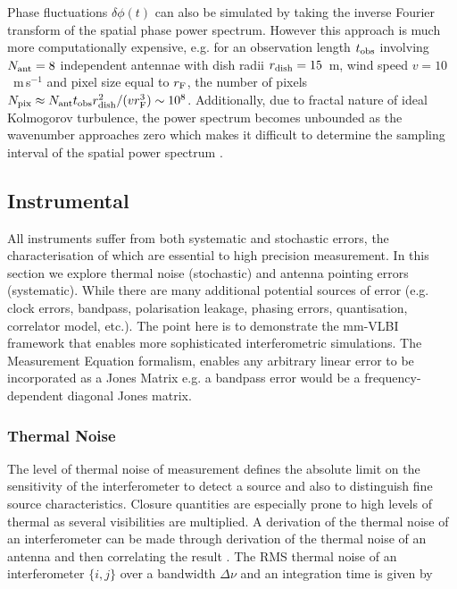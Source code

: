 Phase fluctuations $\delta\phi(t)$ can also be simulated by taking the inverse Fourier transform of the spatial phase power spectrum. However this approach is much more computationally expensive, e.g. for an observation length $t_{\rm obs}$ involving $N_{\rm ant}=8$ independent antennae with dish radii $r_{\rm dish}=15$~m, wind speed $v=10$~m\,s$^{-1}$ and pixel size equal to $r_{\rm F}$, the number of pixels $N_{\rm pix} \approx N_{\rm ant} t_{\rm obs} r_{\rm dish}^2/(v r_{\rm F}^3)  \sim 10^8$. Additionally, due to fractal nature of ideal Kolmogorov turbulence, the power spectrum becomes unbounded as the wavenumber approaches zero which makes it difficult to determine the sampling interval of the spatial power spectrum \citep{Lane_1992}.


\subsection{Instrumental}

All instruments suffer from both systematic and stochastic errors, the characterisation of which are essential to high precision measurement. In this section we explore thermal noise (stochastic) and antenna pointing errors (systematic). 
While there are many additional potential sources of error (e.g. clock errors, bandpass, polarisation leakage, phasing errors, quantisation, correlator model, etc.). The point here is to demonstrate the mm-VLBI framework that enables more sophisticated interferometric simulations. The Measurement Equation formalism, enables any arbitrary linear error to be incorporated as a Jones Matrix e.g. a bandpass error would be a frequency-dependent diagonal Jones matrix.

\subsubsection{Thermal Noise}


The level of thermal noise of measurement defines the absolute limit on the sensitivity of the interferometer to detect a source and also to distinguish fine source characteristics. Closure quantities are especially prone to high levels of thermal as several visibilities are multiplied. A derivation of the thermal noise of an interferometer can be made through derivation of the thermal noise of an antenna and then correlating the result \citep*{Wrobel_1999}. The RMS thermal noise of an interferometer $\{i,j\}$ over a bandwidth $\Delta \nu$ and an integration time is given by 

